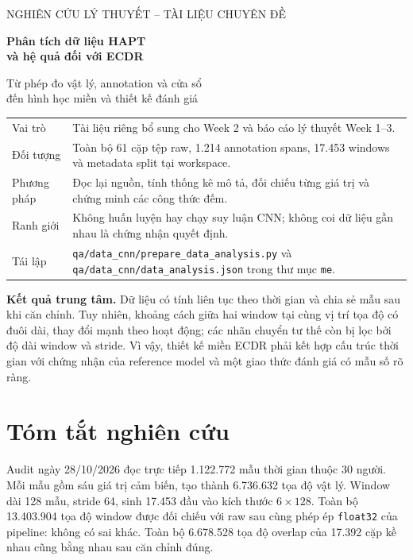 \documentclass[11pt,a4paper]{article}
\newcommand{\code}[1]{{\small\ttfamily\nolinkurl{#1}}}
\theoremstyle{definition}
\begin{document}
\hypersetup{pageanchor=false}
\begin{titlepage}
\vspace*{1.0cm}
{\Large\color{teal} NGHIÊN CỨU LÝ THUYẾT -- TÀI LIỆU CHUYÊN ĐỀ\par}
\vspace{0.6cm}
{\huge\bfseries\color{ink} Phân tích dữ liệu HAPT\\và hệ quả đối với ECDR\par}
\vspace{0.7cm}
{\Large Từ phép đo vật lý, annotation và cửa sổ\\đến hình học miền và thiết kế đánh giá\par}
\vspace{1cm}
\begin{tabularx}{\linewidth}{@{}P{3cm}Y@{}}\toprule
Vai trò & Tài liệu riêng bổ sung cho Week 2 và báo cáo lý thuyết Week 1--3.\\
Đối tượng & Toàn bộ 61 cặp tệp raw, 1.214 annotation spans, 17.453 windows và metadata split tại workspace.\\
Phương pháp & Đọc lại nguồn, tính thống kê mô tả, đối chiếu từng giá trị và chứng minh các công thức đếm.\\
Ranh giới & Không huấn luyện hay chạy suy luận CNN; không coi dữ liệu gần nhau là chứng nhận quyết định.\\
Tái lập & \code{qa/data_cnn/prepare_data_analysis.py} và \code{qa/data_cnn/data_analysis.json} trong thư mục \code{me}.\\\bottomrule
\end{tabularx}
\vfill
\textbf{Kết quả trung tâm.} Dữ liệu có tính liên tục theo thời gian và chia sẻ
mẫu sau khi căn chỉnh. Tuy nhiên, khoảng cách giữa hai window tại cùng vị trí
tọa độ có đuôi dài, thay đổi mạnh theo hoạt động; các nhãn chuyển tư thế còn
bị lọc bởi độ dài window và stride. Vì vậy, thiết kế miền ECDR phải kết hợp
cấu trúc thời gian với chứng nhận của reference model và một giao thức đánh
giá có mẫu số rõ ràng.
\end{titlepage}
\hypersetup{pageanchor=true}

\section*{Tóm tắt nghiên cứu}
Audit ngày 28/10/2026 đọc trực tiếp 1.122.772 mẫu thời gian thuộc 30 người.
Mỗi mẫu gồm sáu giá trị cảm biến, tạo thành 6.736.632 tọa độ vật lý. Window
dài 128 mẫu, stride 64, sinh 17.453 đầu vào kích thước $6\times128$.
Toàn bộ 13.403.904 tọa độ window được đối chiếu với raw sau cùng phép ép
\code{float32} của pipeline: không có sai khác. Toàn bộ 6.678.528 tọa độ
overlap của 17.392 cặp kề nhau cũng bằng nhau sau căn chỉnh đúng.
\end{document}
